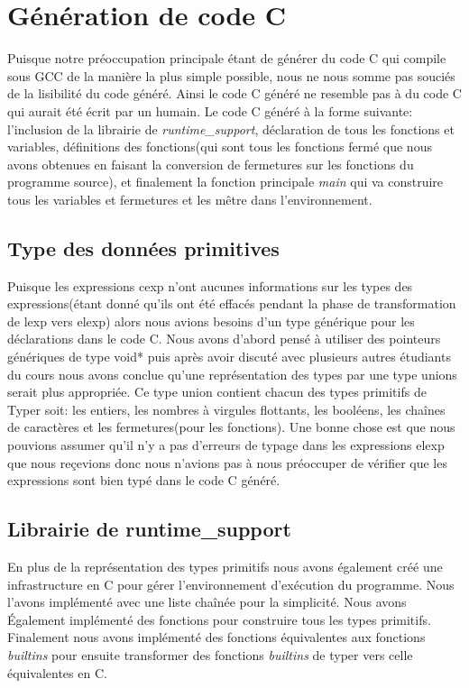 \documentclass{article}
\begin{document}
\section{Génération de code C}
Puisque notre préoccupation principale étant de générer du code C qui compile
sous GCC de la manière la plus simple possible, nous ne nous somme pas souciés
de la lisibilité du code généré. Ainsi le code C généré ne resemble pas à du
code C qui aurait été écrit par un humain. Le code C généré à la forme suivante:
l'inclusion de la librairie de \textit{runtime\_support}, déclaration de tous 
les fonctions et variables, définitions des fonctions(qui sont tous les
fonctions fermé que nous avons obtenues en faisant la conversion de fermetures
sur les fonctions du programme source),  et finalement la fonction principale
\textit{main} qui va construire tous les variables et fermetures et les mêtre
dans l'environnement.

\subsection{Type des données primitives}
Puisque les expressions cexp n'ont aucunes informations sur les types des 
expressions(étant donné qu'ils ont été effacés pendant la phase de 
transformation de lexp vers elexp) alors nous avions besoins d'un type
générique pour les déclarations dans le code C. Nous avons d'abord pensé à
utiliser des pointeurs génériques de type void* puis après avoir discuté avec
plusieurs autres étudiants du cours nous avons conclue qu'une représentation
des types par une type unions serait plus appropriée. Ce type union contient
chacun des types primitifs de Typer soit: les entiers, les nombres à virgules
flottants, les booléens, les chaînes de caractères et les fermetures(pour les
fonctions). Une bonne chose est que nous pouvions assumer qu'il n'y a pas
d'erreurs de typage dans les expressions elexp que nous reçevions donc nous
n'avions pas à nous préoccuper de vérifier que les expressions sont bien
typé dans le code C généré.

\subsection{Librairie de runtime\_support}
En plus de la représentation des types primitifs nous avons également créé
une infrastructure en C pour gérer l'environnement d'exécution du programme.
Nous l'avons implémenté avec une liste chaînée pour la simplicité. Nous avons
Également implémenté des fonctions pour construire tous les types primitifs.
Finalement nous avons implémenté des fonctions équivalentes aux fonctions
\textit{builtins} pour ensuite transformer des fonctions \textit{builtins}
de typer vers celle équivalentes en C.
\end{document}
